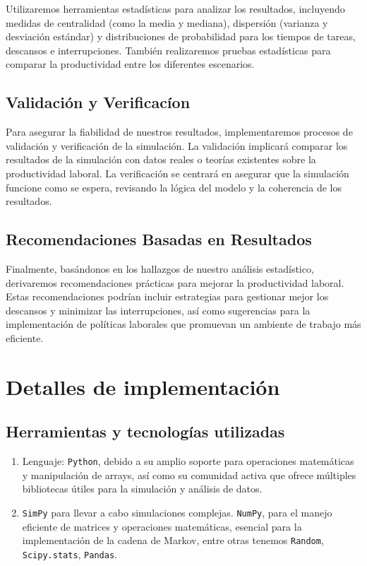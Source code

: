 \documentclass[10pt,a4paper,twocolumn]{article}
\begin{document}
Utilizaremos herramientas estadísticas para analizar los resultados, incluyendo medidas de centralidad (como la media y mediana), dispersión (varianza y desviación estándar) y distribuciones de probabilidad para los tiempos de tareas, descansos e interrupciones. También realizaremos pruebas estadísticas para comparar la productividad entre los diferentes escenarios.    

\subsection{Validaci\'on y Verificac\'ion}

Para asegurar la fiabilidad de nuestros resultados, implementaremos procesos de validación y verificación de la simulación. La validación implicará comparar los resultados de la simulación con datos reales o teorías existentes sobre la productividad laboral. La verificación se centrará en asegurar que la simulación funcione como se espera, revisando la lógica del modelo y la coherencia de los resultados.

\subsection{Recomendaciones Basadas en Resultados}

Finalmente, basándonos en los hallazgos de nuestro análisis estadístico, derivaremos recomendaciones prácticas para mejorar la productividad laboral. Estas recomendaciones podrían incluir estrategias para gestionar mejor los descansos y minimizar las interrupciones, así como sugerencias para la implementación de políticas laborales que promuevan un ambiente de trabajo más eficiente.

\section{Detalles de implementación}

\subsection{Herramientas y tecnolog\'ias utilizadas}

\begin{enumerate}
    \item Lenguaje: \texttt{Python}, debido a su amplio soporte para operaciones matemáticas y manipulación de arrays, así como su comunidad activa que ofrece múltiples bibliotecas útiles para la simulación y análisis de datos.
    \item \texttt{SimPy} para llevar a cabo simulaciones complejas. \texttt{NumPy}, para el manejo eficiente de matrices y operaciones matemáticas, esencial para la implementación de la cadena de Markov, entre otras tenemos \texttt{Random}, \texttt{Scipy.stats}, \texttt{Pandas}.
\end{enumerate}
\end{document}
